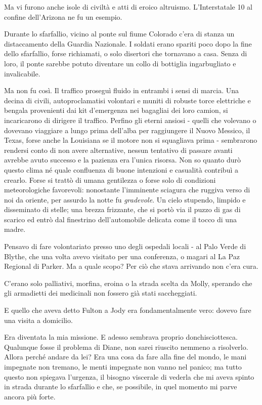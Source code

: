Ma vi furono anche isole di civiltà e atti di eroico altruismo.
L'Interstatale 10 al confine dell'Arizona ne fu un esempio.

Durante lo sfarfallio, vicino al ponte sul fiume Colorado c'era di
stanza un distaccamento della Guardia Nazionale. I soldati erano spariti
poco dopo la fine dello sfarfallio, forse richiamati, o solo disertori
che tornavano a casa. Senza di loro, il ponte sarebbe potuto diventare
un collo di bottiglia ingarbugliato e invalicabile.

Ma non fu così. Il traffico proseguì fluido in entrambi i sensi di
marcia. Una decina di civili, autoproclamatisi volontari e muniti di
robuste torce elettriche e bengala provenienti dai kit d'emergenza nei
bagagliai dei loro camion, si incaricarono di dirigere il traffico.
Perfino gli eterni ansiosi - quelli che volevano o dovevano viaggiare a
lungo prima dell'alba per raggiungere il Nuovo Messico, il Texas, forse
anche la Louisiana se il motore non si squagliava prima - sembrarono
rendersi conto di non avere alternative, nessun tentativo di passare
avanti avrebbe avuto successo e la pazienza era l'unica risorsa. Non so
quanto durò questo clima né quale confluenza di buone intenzioni e
casualità contribuì a crearlo. Forse si trattò di umana gentilezza o
forse solo di condizioni meteorologiche favorevoli: nonostante
l'imminente sciagura che ruggiva verso di noi da oriente, per assurdo la
notte fu \emph{gradevole}. Un cielo stupendo, limpido e disseminato di
stelle; una brezza frizzante, che si portò via il puzzo di gas di
scarico ed entrò dal finestrino dell'automobile delicata come il tocco
di una madre.

\separatorefiori

Pensavo di fare volontariato presso uno degli ospedali locali - al Palo
Verde di Blythe, che una volta avevo visitato per una conferenza, o
magari al La Paz Regional di Parker. Ma a quale scopo? Per ciò che stava
arrivando non c'era cura.

C'erano solo palliativi, morfina, eroina o la strada scelta da Molly,
sperando che gli armadietti dei medicinali non fossero già stati
saccheggiati.

E quello che aveva detto Fulton a Jody era fondamentalmente vero: dovevo
fare una visita a domicilio.

Era diventata la mia missione. E adesso sembrava proprio
donchisciottesca. Qualunque fosse il problema di Diane, non sarei
riuscito nemmeno a risolverlo. Allora perché andare da lei? Era una cosa
da fare alla fine del mondo, le mani impegnate non tremano, le menti
impegnate non vanno nel panico; ma tutto questo non spiegava l'urgenza,
il bisogno viscerale di vederla che mi aveva spinto in strada durante lo
sfarfallio e che, se possibile, in quel momento mi parve ancora più
forte.

